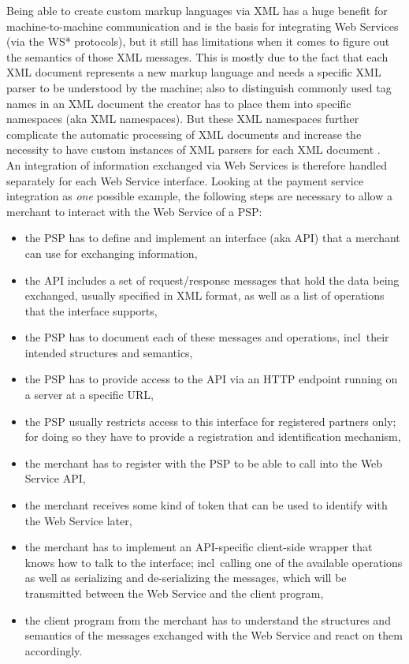 Being able to create custom markup languages via \gls{XML} has a huge benefit for machine-to-machine communication and is the basis for integrating Web Services (via the WS* protocols), but it still has limitations when it comes to figure out the semantics of those \gls{XML} messages. This is mostly due to the fact that each \gls{XML} document represents a new markup language and needs a specific \gls{XML} parser to be understood by the machine; also to distinguish commonly used tag names in an \gls{XML} document the creator has to place them into specific namespaces (aka \gls{XML} namespaces). But these \gls{XML} namespaces further complicate the automatic processing of \gls{XML} documents and increase the necessity to have custom instances of \gls{XML} parsers for each \gls{XML} document \citep{taylor2008p2p}. \\

An integration of information exchanged via Web Services is therefore handled separately for each Web Service interface. Looking at the payment service integration as \emph{one} possible example, the following steps are necessary to allow a merchant to interact with the Web Service of a \gls{PSP}: \@

\begin{itemize}
  \item the \gls{PSP} has to define and implement an interface (aka \gls{API}) that a merchant can use for exchanging information,
  \item the \gls{API} includes a set of request/response messages that hold the data being exchanged, usually specified in \gls{XML} format, as well as a list of operations that the interface supports,
  \item the \gls{PSP} has to document each of these messages and operations, \gls{incl}\ their intended structures and semantics,
  \item the \gls{PSP} has to provide access to the \gls{API} via an \gls{HTTP} endpoint running on a server at a specific \gls{URL},
  \item the \gls{PSP} usually restricts access to this interface for registered partners only; for doing so they have to provide a registration and identification mechanism,
  \item the merchant has to register with the \gls{PSP} to be able to call into the Web Service \gls{API},
  \item the merchant receives some kind of token that can be used to identify with the Web Service later,
  \item the merchant has to implement an \gls{API}-specific client-side wrapper that knows how to talk to the interface; \gls{incl}\ calling one of the available operations as well as serializing and de-serializing the messages, which will be transmitted between the Web Service and the client program,
  \item the client program from the merchant has to understand the structures and semantics of the messages exchanged with the Web Service and react on them accordingly.
\end{itemize}

